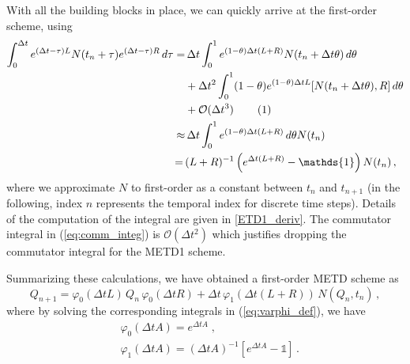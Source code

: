 \documentclass[12pt]{article}
\newcommand\numberthis{\addtocounter{equation}{1}\tag{\theequation}}
\begin{document}
With all the building blocks in place, we can quickly arrive at the first-order scheme, using
{
\begin{align*}
    \label{eq:comm_integ}
    \int_0^{\Delta t} e^{(\Delta t-\tau)L}  N(t_n+\tau) e^{(\Delta t-\tau)R}\,d\tau  =  & \, \Delta t\int_0^{1} e^{(1-\theta)\Delta t(L+R)} N(t_n+\Delta t \theta)\,d\theta  \,  \\ &+ \Delta t^2 \int_0^{1} (1-\theta) e^{(1-\theta)\Delta t L} [N(t_n+\Delta t \theta),R]\,d\theta    \\ &+ \mathcal O(\Delta t^3) \, \numberthis
   \\ \approx &\, \Delta t\int_0^{1} e^{(1-\theta)\Delta t(L+R)} \,d\theta N(t_n) 
   \\ = \, &(L+R)^{-1}\left(e^{\Delta t (L+R)} - \mathds{1}\right) N(t_n) \,,
\end{align*}
}
where we approximate $N$ to first-order as a constant between $t_{n}$ and $t_{n+1}$ (in the following, index $n$ represents the temporal index for discrete time steps). Details of the computation of the integral are given in \ref{ETD1_deriv}. The commutator integral in (\ref{eq:comm_integ}) is $\mathcal O(\Delta t^2)$ which justifies dropping the commutator integral for the METD1 scheme. 

Summarizing these calculations, we have obtained a first-order METD scheme as
\begin{equation}
\label{eq:etd1-eqn}
  Q_{n+1} = \varphi_0(\Delta t L)\, Q_{n}\,  \varphi_0(\Delta t R) + \Delta t \, \varphi_1(\Delta t(L+R))\, N(Q_{n}, t_n)\,,
\end{equation}
where by solving the corresponding integrals in (\ref{eq:varphi_def}), we have
\begin{align*}
  &\varphi_0(\Delta tA) = e^{\Delta t A}\; \text{,}\\ &\varphi_1(\Delta tA) = (\Delta t A)^{-1}\left[e^{\Delta t A} - \mathds{1}\right]\,.
\end{align*}
\end{document}
